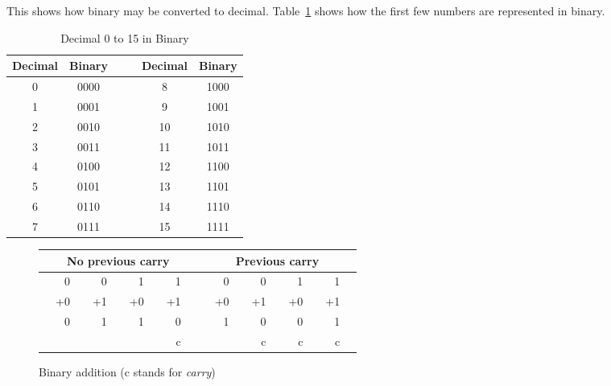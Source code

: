 This shows how binary may be converted to decimal. Table~\ref{tab:dec-bin}
shows how the first few numbers are represented in binary.
\begin{table}[t]
\begin{center}
\begin{tabular}{||c|c||cc||c|c||}
\hline
Decimal & Binary & & & Decimal & Binary \\
\hline
0       & 0000   & & & 8       & 1000 \\
\hline
1       & 0001   & & & 9       & 1001 \\
\hline
2       & 0010   & & & 10      & 1010 \\
\hline
3       & 0011   & & & 11      & 1011 \\
\hline
4       & 0100   & & & 12      & 1100 \\
\hline
5       & 0101   & & & 13      & 1101 \\
\hline
6       & 0110   & & & 14      & 1110 \\
\hline
7       & 0111   & & & 15      & 1111 \\
\hline
\end{tabular}
\caption{Decimal 0 to 15 in Binary\label{tab:dec-bin}}
\end{center}
\end{table}


\begin{figure}[h]
\begin{center}
\begin{tabular}{|rrrrrrrrp{.1cm}|p{.1cm}rrrrrrrr|}
\hline
& \multicolumn{7}{c}{No previous carry} & & & \multicolumn{7}{c}{Previous carry} & \\
\hline
&  0 & &  0 & &  1 & &  1 & & &  0 & &  0 & &  1 & & 1  & \\
& +0 & & +1 & & +0 & & +1 & & & +0 & & +1 & & +0 & & +1 &  \\
\cline{2-2} \cline{4-4} \cline{6-6} \cline{8-8} \cline{11-11} \cline{13-13} \cline{15-15} \cline{17-17}
& 0  & & 1  & & 1  & & 0  & & & 1  & & 0  & & 0  & & 1 & \\
&    & &    & &    & & c  & & &    & & c  & & c  & & c & \\
\hline
\end{tabular}

\caption{Binary addition (c stands for \emph{carry})\label{fig:bin-add}}
\end{center}
\end{figure}

